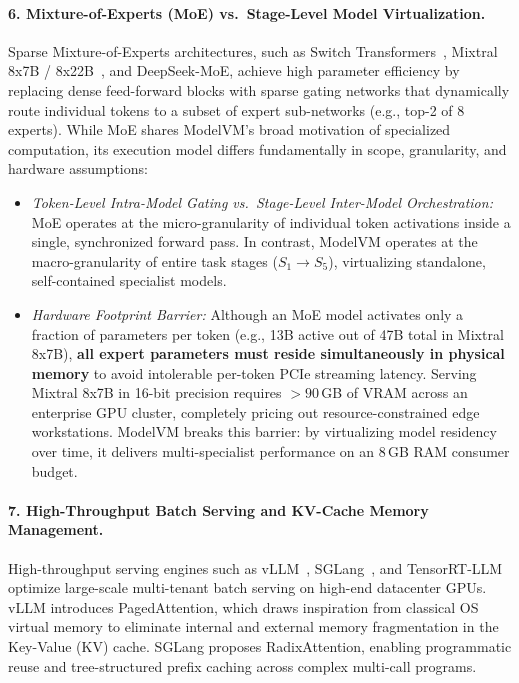 \paragraph{6. Mixture-of-Experts (MoE) vs.\ Stage-Level Model Virtualization.}
Sparse Mixture-of-Experts architectures, such as Switch Transformers~\cite{fedus2022switch}, Mixtral 8x7B / 8x22B~\cite{jiang2024mixtral}, and DeepSeek-MoE, achieve high parameter efficiency by replacing dense feed-forward blocks with sparse gating networks that dynamically route individual tokens to a subset of expert sub-networks (e.g., top-2 of 8 experts). While MoE shares ModelVM's broad motivation of specialized computation, its execution model differs fundamentally in scope, granularity, and hardware assumptions:
\begin{itemize}
    \item \textit{Token-Level Intra-Model Gating vs.\ Stage-Level Inter-Model Orchestration:} MoE operates at the micro-granularity of individual token activations inside a single, synchronized forward pass. In contrast, ModelVM operates at the macro-granularity of entire task stages ($S_1 \to S_5$), virtualizing standalone, self-contained specialist models.
    \item \textit{Hardware Footprint Barrier:} Although an MoE model activates only a fraction of parameters per token (e.g., 13B active out of 47B total in Mixtral 8x7B), \textbf{all expert parameters must reside simultaneously in physical memory} to avoid intolerable per-token PCIe streaming latency. Serving Mixtral 8x7B in 16-bit precision requires $> 90$\,GB of VRAM across an enterprise GPU cluster, completely pricing out resource-constrained edge workstations. ModelVM breaks this barrier: by virtualizing model residency over time, it delivers multi-specialist performance on an 8\,GB RAM consumer budget.
\end{itemize}

\paragraph{7. High-Throughput Batch Serving and KV-Cache Memory Management.}
High-throughput serving engines such as vLLM~\cite{kwon2023vllm}, SGLang~\cite{zheng2023sglang}, and TensorRT-LLM optimize large-scale multi-tenant batch serving on high-end datacenter GPUs. vLLM introduces PagedAttention, which draws inspiration from classical OS virtual memory to eliminate internal and external memory fragmentation in the Key-Value (KV) cache. SGLang proposes RadixAttention, enabling programmatic reuse and tree-structured prefix caching across complex multi-call programs.

